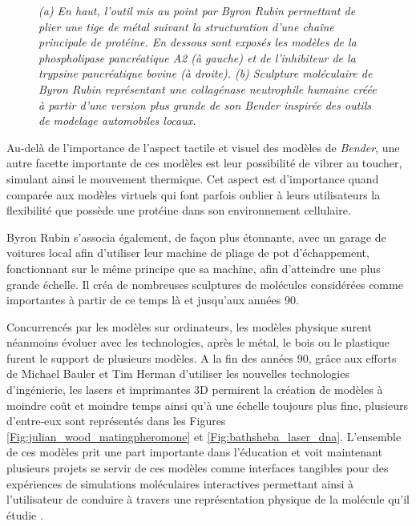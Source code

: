 \begin{figure}
\begin{subfigure}{.5\textwidth}
    \label{Fig:byron_rubin_art}
  \caption{}
  \hspace{0.2cm}
  \end{subfigure}%
 \caption[(a) \textit{Byron's Bender} et plusieurs représentations physiques de protéines créées avec l'outil. (b) Sculpture moléculaire d'une collagénase de Byron Rubin.]{\it (a) En haut, l'outil mis au point par Byron Rubin permettant de plier une tige de métal suivant la structuration d'une chaîne principale de protéine. En dessous sont exposés les modèles de la phospholipase pancréatique A2 (à gauche) et de l'inhibiteur de la trypsine pancréatique bovine (à droite).
  (b) Sculpture moléculaire de Byron Rubin représentant une collagénase neutrophile humaine créée à partir d'une version plus grande de son Bender inspirée des outils de modelage automobiles locaux.}
\end{figure}

Au-delà de l'importance de l'aspect tactile et visuel des modèles de \textit{Bender}, une autre facette importante de ces modèles est leur possibilité de vibrer au toucher, simulant ainsi le mouvement thermique. Cet aspect est d'importance quand comparée aux modèles virtuels qui font parfois oublier à leurs utilisateurs la flexibilité que possède une protéine dans son environnement cellulaire. 

Byron Rubin s'associa également, de façon plus étonnante, avec un garage de voitures local afin d'utiliser leur machine de pliage de pot d'échappement, fonctionnant sur le même principe que sa machine, afin d'atteindre une plus grande échelle. Il créa de nombreuses sculptures de molécules considérées comme importantes à partir de ce temps là et jusqu'aux années 90.

Concurrencés par les modèles sur ordinateurs, les modèles physique surent néanmoins évoluer avec les technologies, après le métal, le bois ou le plastique furent le support de plusieurs modèles. A la fin des années 90, grâce aux efforts de Michael Bauler et Tim Herman d'utiliser les nouvelles technologies d’ingénierie, les lasers et imprimantes 3D permirent la création de modèles à moindre coût et moindre temps ainsi qu'à une échelle toujours plus fine, plusieurs d'entre-eux sont représentés dans les Figures \ref{Fig:julian_wood_matingpheromone} et \ref{Fig:bathsheba_laser_dna}. L'ensemble de ces modèles prit une part importante dans l'éducation et voit maintenant plusieurs projets se servir de ces modèles comme interfaces tangibles pour des expériences de simulations moléculaires interactives permettant ainsi à l'utilisateur de conduire à travers une représentation physique de la molécule qu'il étudie \cite{gillet2005tangible}.


